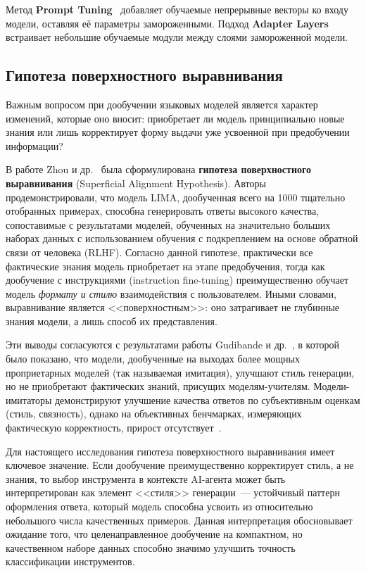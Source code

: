 Метод \textbf{Prompt Tuning}~\cite{lester2021power} добавляет обучаемые непрерывные векторы ко входу модели, оставляя её параметры замороженными. Подход \textbf{Adapter Layers}~\cite{houlsby2019parameter} встраивает небольшие обучаемые модули между слоями замороженной модели.

\subsection{Гипотеза поверхностного выравнивания}

Важным вопросом при дообучении языковых моделей является характер изменений, которые оно вносит: приобретает ли модель принципиально новые знания или лишь корректирует форму выдачи уже усвоенной при предобучении информации?

В работе Zhou и др.~\cite{zhou2023lima} была сформулирована \textbf{гипотеза поверхностного выравнивания} (Superficial Alignment Hypothesis). Авторы продемонстрировали, что модель LIMA, дообученная всего на 1000 тщательно отобранных примерах, способна генерировать ответы высокого качества, сопоставимые с результатами моделей, обученных на значительно больших наборах данных с использованием обучения с подкреплением на основе обратной связи от человека (RLHF). Согласно данной гипотезе, практически все фактические знания модель приобретает на этапе предобучения, тогда как дообучение с инструкциями (instruction fine-tuning) преимущественно обучает модель \textit{формату и стилю} взаимодействия с пользователем. Иными словами, выравнивание является <<поверхностным>>: оно затрагивает не глубинные знания модели, а лишь способ их представления.

Эти выводы согласуются с результатами работы Gudibande и др.~\cite{gudibande2023false}, в которой было показано, что модели, дообученные на выходах более мощных проприетарных моделей (так называемая имитация), улучшают стиль генерации, но не приобретают фактических знаний, присущих моделям-учителям. Модели-имитаторы демонстрируют улучшение качества ответов по субъективным оценкам (стиль, связность), однако на объективных бенчмарках, измеряющих фактическую корректность, прирост отсутствует~\cite{gudibande2023false}.

Для настоящего исследования гипотеза поверхностного выравнивания имеет ключевое значение. Если дообучение преимущественно корректирует стиль, а не знания, то выбор инструмента в контексте AI-агента может быть интерпретирован как элемент <<стиля>> генерации~--- устойчивый паттерн оформления ответа, который модель способна усвоить из относительно небольшого числа качественных примеров. Данная интерпретация обосновывает ожидание того, что целенаправленное дообучение на компактном, но качественном наборе данных способно значимо улучшить точность классификации инструментов.

